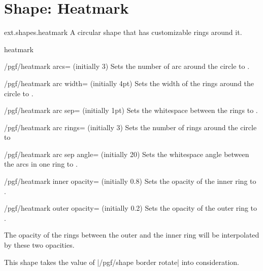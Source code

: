 %
%
%
\section{Shape: Heatmark}
\begin{pgflibrary}{ext.shapes.heatmark}
  A circular shape that has customizable rings around it.
\end{pgflibrary}

\begin{shape}{heatmark}
  \begin{key}{/pgf/heatmark arcs= (initially 3)}
  Sets the number of arc around the circle to .
  \end{key}
  \begin{key}{/pgf/heatmark arc width= (initially 4pt)}
  Sets the width of the rings around the circle to .
  \end{key}
  \begin{key}{/pgf/heatmark arc sep= (initially 1pt)}
  Sets the whitespace between the rings to .
  \end{key}
  \begin{key}{/pgf/heatmark arc rings= (initially 3)}
  Sets the number of rings around the circle to 
  \end{key}
  \begin{key}{/pgf/heatmark arc sep angle= (initially 20)}
  Sets the whitespace angle between the arcs in one ring to .
  \end{key}
  \begin{key}{/pgf/heatmark inner opacity= (initially 0.8)}
  Sets the opacity of the inner ring to .
  \end{key}
  \begin{key}{/pgf/heatmark outer opacity= (initially 0.2)}
  Sets the opacity of the outer ring to .
  
  The opacity of the rings between the outer and the inner ring will be interpolated by these two opacities.
  \end{key}

This shape takes the value of |/pgf/shape border rotate|%
 into consideration.


\end{shape}

